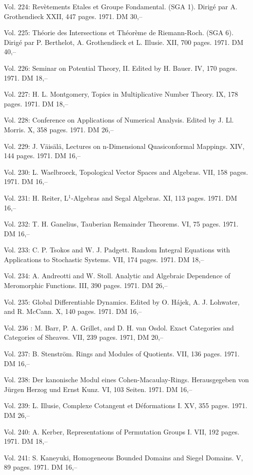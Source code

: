Vol. 224: Revètements Etales et Groupe Fondamental. (SGA 1). Dirigé par A. Grothendieck XXII, 447 pages. 1971. DM 30,--

Vol. 225: Théorie des Intersections et Théorème de Riemann-Roch. (SGA 6). Dirigé par P. Berthelot, A. Grothendieck et L. Illusie. XII, 700 pages. 1971. DM 40,--

Vol. 226: Seminar on Potential Theory, II. Edited by H. Bauer. IV, 170 pages. 1971. DM 18,--

Vol. 227: H. L. Montgomery, Topics in Multiplicative Number Theory. IX, 178 pages. 1971. DM 18,--

Vol. 228: Conference on Applications of Numerical Analysis. Edited by J. Ll. Morris. X, 358 pages. 1971. DM 26,--

Vol. 229: J. Väisälä, Lectures on n-Dimensional Quasiconformal Mappings. XIV, 144 pages. 1971. DM 16,--

Vol. 230: L. Waelbroeck, Topological Vector Spaces and Algebras. VII, 158 pages. 1971. DM 16,--

Vol. 231: H. Reiter, L$^1$-Algebras and Segal Algebras. XI, 113 pages. 1971. DM 16,--

Vol. 232: T. H. Ganelius, Tauberian Remainder Theorems. VI, 75 pages. 1971. DM 16,--

Vol. 233: C. P. Tsokos and W. J. Padgett. Random Integral Equations with Applications to Stochastic Systems. VII, 174 pages. 1971. DM 18,--

Vol. 234: A. Andreotti and W. Stoll. Analytic and Algebraic Dependence of Meromorphic Functions. III, 390 pages. 1971. DM 26,--

Vol. 235: Global Differentiable Dynamics. Edited by O. Hájek, A. J. Lohwater, and R. McCann. X, 140 pages. 1971. DM 16,--

Vol. 236 : M. Barr, P. A. Grillet, and D. H. van Osdol. Exact Categories and Categories of Sheaves. VII, 239 pages. 1971, DM 20,--

Vol. 237: B. Stenström. Rings and Modules of Quotients. VII, 136 pages. 1971. DM 16,--

Vol. 238: Der kanonische Modul eines Cohen-Macaulay-Rings. Herausgegeben von Jürgen Herzog und Ernst Kunz. VI, 103 Seiten. 1971. DM 16,--

Vol. 239: L. Illusie, Complexe Cotangent et Déformations I. XV, 355 pages. 1971. DM 26,--

Vol. 240: A. Kerber, Representations of Permutation Groups I. VII, 192 pages. 1971. DM 18,--

Vol. 241: S. Kaneyuki, Homogeneous Bounded Domains and Siegel Domains. V, 89 pages. 1971. DM 16,--

